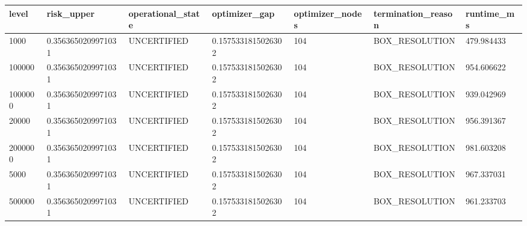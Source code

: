 \begin{tabular}{lllllll}
\toprule
level & risk\_upper & operational\_state & optimizer\_gap & optimizer\_nodes & termination\_reason & runtime\_ms \\
\midrule
1000 & 0.3563650209971031 & UNCERTIFIED & 0.1575331815026302 & 104 & BOX\_RESOLUTION & 479.984433 \\
100000 & 0.3563650209971031 & UNCERTIFIED & 0.1575331815026302 & 104 & BOX\_RESOLUTION & 954.606622 \\
1000000 & 0.3563650209971031 & UNCERTIFIED & 0.1575331815026302 & 104 & BOX\_RESOLUTION & 939.042969 \\
20000 & 0.3563650209971031 & UNCERTIFIED & 0.1575331815026302 & 104 & BOX\_RESOLUTION & 956.391367 \\
2000000 & 0.3563650209971031 & UNCERTIFIED & 0.1575331815026302 & 104 & BOX\_RESOLUTION & 981.603208 \\
5000 & 0.3563650209971031 & UNCERTIFIED & 0.1575331815026302 & 104 & BOX\_RESOLUTION & 967.337031 \\
500000 & 0.3563650209971031 & UNCERTIFIED & 0.1575331815026302 & 104 & BOX\_RESOLUTION & 961.233703 \\
\bottomrule
\end{tabular}
